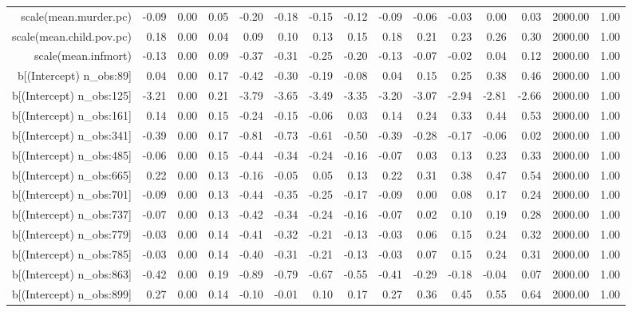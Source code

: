 \begin{table}[ht]
\begin{tabular}{rrrrrrrrrrrrrrr}
  scale(mean.murder.pc) & -0.09 & 0.00 & 0.05 & -0.20 & -0.18 & -0.15 & -0.12 & -0.09 & -0.06 & -0.03 & 0.00 & 0.03 & 2000.00 & 1.00 \\ 
  scale(mean.child.pov.pc) & 0.18 & 0.00 & 0.04 & 0.09 & 0.10 & 0.13 & 0.15 & 0.18 & 0.21 & 0.23 & 0.26 & 0.30 & 2000.00 & 1.00 \\ 
  scale(mean.infmort) & -0.13 & 0.00 & 0.09 & -0.37 & -0.31 & -0.25 & -0.20 & -0.13 & -0.07 & -0.02 & 0.04 & 0.12 & 2000.00 & 1.00 \\ 
  b[(Intercept) n\_obs:89] & 0.04 & 0.00 & 0.17 & -0.42 & -0.30 & -0.19 & -0.08 & 0.04 & 0.15 & 0.25 & 0.38 & 0.46 & 2000.00 & 1.00 \\ 
  b[(Intercept) n\_obs:125] & -3.21 & 0.00 & 0.21 & -3.79 & -3.65 & -3.49 & -3.35 & -3.20 & -3.07 & -2.94 & -2.81 & -2.66 & 2000.00 & 1.00 \\ 
  b[(Intercept) n\_obs:161] & 0.14 & 0.00 & 0.15 & -0.24 & -0.15 & -0.06 & 0.03 & 0.14 & 0.24 & 0.33 & 0.44 & 0.53 & 2000.00 & 1.00 \\ 
  b[(Intercept) n\_obs:341] & -0.39 & 0.00 & 0.17 & -0.81 & -0.73 & -0.61 & -0.50 & -0.39 & -0.28 & -0.17 & -0.06 & 0.02 & 2000.00 & 1.00 \\ 
  b[(Intercept) n\_obs:485] & -0.06 & 0.00 & 0.15 & -0.44 & -0.34 & -0.24 & -0.16 & -0.07 & 0.03 & 0.13 & 0.23 & 0.33 & 2000.00 & 1.00 \\ 
  b[(Intercept) n\_obs:665] & 0.22 & 0.00 & 0.13 & -0.16 & -0.05 & 0.05 & 0.13 & 0.22 & 0.31 & 0.38 & 0.47 & 0.54 & 2000.00 & 1.00 \\ 
  b[(Intercept) n\_obs:701] & -0.09 & 0.00 & 0.13 & -0.44 & -0.35 & -0.25 & -0.17 & -0.09 & 0.00 & 0.08 & 0.17 & 0.24 & 2000.00 & 1.00 \\ 
  b[(Intercept) n\_obs:737] & -0.07 & 0.00 & 0.13 & -0.42 & -0.34 & -0.24 & -0.16 & -0.07 & 0.02 & 0.10 & 0.19 & 0.28 & 2000.00 & 1.00 \\ 
  b[(Intercept) n\_obs:779] & -0.03 & 0.00 & 0.14 & -0.41 & -0.32 & -0.21 & -0.13 & -0.03 & 0.06 & 0.15 & 0.24 & 0.32 & 2000.00 & 1.00 \\ 
  b[(Intercept) n\_obs:785] & -0.03 & 0.00 & 0.14 & -0.40 & -0.31 & -0.21 & -0.13 & -0.03 & 0.07 & 0.15 & 0.24 & 0.31 & 2000.00 & 1.00 \\ 
  b[(Intercept) n\_obs:863] & -0.42 & 0.00 & 0.19 & -0.89 & -0.79 & -0.67 & -0.55 & -0.41 & -0.29 & -0.18 & -0.04 & 0.07 & 2000.00 & 1.00 \\ 
  b[(Intercept) n\_obs:899] & 0.27 & 0.00 & 0.14 & -0.10 & -0.01 & 0.10 & 0.17 & 0.27 & 0.36 & 0.45 & 0.55 & 0.64 & 2000.00 & 1.00 \\ 

\end{tabular}
\end{table}
